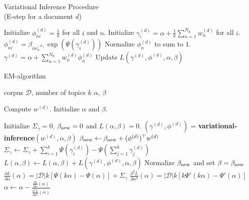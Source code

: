 \documentclass[final]{beamer}
\newlength{\onecolwid}
\begin{document}
\begin{frame}[t]
\begin{columns}[t]
\begin{column}{\onecolwid}
\begin{block}{Variational Inference Procedure \\ (E-step for a document $d$)}
\begin{algorithmic}[1]
\STATE Initialize $\phi_{ni}^{(d)} = \frac{1}{k}$ for all $i$ and $n$.
\STATE Initialize $\gamma_i^{(d)} = \alpha + \frac{1}{k}\sum_{n=1}^{N_d} w_n^{(d)}$ for all $i$.
\STATE $\phi_{ni}^{(d)} = \beta_{iw_n^{(d)}}\exp(\Psi(\gamma_i^{(d)}))$
\ENDFOR
\STATE Normalize $\phi_n^{(d)}$ to sum to $1$.
\ENDFOR
\STATE $\gamma^{(d)} = \alpha + \sum_{n=1}^{N_d} w_n^{(d)} \phi_n^{(d)}$
\STATE Update $L(\gamma^{(d)}, \phi^{(d)}, \alpha, \beta)$
\ENDWHILE
\end{algorithmic}
\end{block}


\begin{block}{EM-algorithm}

\begin{algorithmic}[1]
\REQUIRE corpus $\mathcal{D}$, number of topics $k$
\ENSURE $\alpha$, $\beta$

\STATE Compute $w^{(d)}$.
\ENDFOR
\STATE Initialize $\alpha$ and $\beta$.

\STATE Initialize $\Sigma_{\gamma} = 0$, $\beta_{\textnormal{new}} = 0$ and $L(\alpha, \beta) = 0$.
\STATE $(\gamma^{(d)}, \phi^{(d)})$ = \textbf{variational-inference}$(w^{(d)}, \alpha, \beta)$
\STATE $\beta_{\textnormal{new}} \leftarrow \beta_{\textnormal{new}} + (\phi^{(d)})^{\top}w^{(d)}$
\STATE $\Sigma_{\gamma} \leftarrow \Sigma_{\gamma} + \sum_{i=1}^k \Psi (\gamma_i^{(d)}) - \Psi\left( \sum_{j=1}^k \gamma_j^{(d)}\right)$
\STATE $L(\alpha, \beta) \leftarrow L(\alpha, \beta) +L(\gamma^{(d)}, \phi^{(d)}, \alpha, \beta)$
\ENDFOR
\STATE Normalize $\beta_{\textnormal{new}}$ and set $\beta = \beta_{\textnormal{new}}$
\STATE $\frac{\partial L}{\partial \alpha}(\alpha) = |\mathcal{D}| k \left[ \Psi\left( k \alpha \right) - \Psi(\alpha)\right] + \Sigma_{\gamma}$
\STATE $\frac{\partial^2 L}{\partial \alpha^2}(\alpha) = |\mathcal{D}|k [k\Psi'(k\alpha) - \Psi' \left( \alpha\right)]$
\STATE $\alpha \leftarrow \alpha - \frac{\frac{\partial L}{\partial \alpha}(\alpha)}{\frac{\partial^2 L}{\partial \alpha^2}(\alpha)}$
\ENDWHILE
\ENDWHILE
\end{algorithmic}
\end{block}


\end{column}
\end{columns}
\end{frame}
\end{document}
